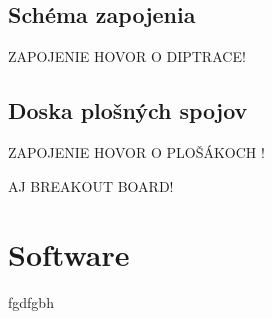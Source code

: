 \subsection{Schéma zapojenia}

ZAPOJENIE HOVOR O DIPTRACE!

\subsection{Doska plošných spojov}

ZAPOJENIE HOVOR O PLOŠÁKOCH !

AJ BREAKOUT BOARD!

\section{Software}
fgdfgbh 